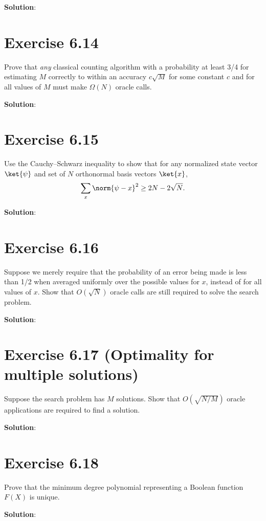\documentclass{book}
\begin{document}
    \textbf{Solution}:

\section*{Exercise 6.14}
    Prove that \emph{any} classical counting algorithm with a probability at least 3/4 for estimating $M$ correctly to within an accuracy $c\sqrt{M}$ for some constant $c$ and for all values of $M$ must make $\Omega (N)$ oracle calls. 
    
    \textbf{Solution}:

\section*{Exercise 6.15}
    Use the Cauchy–Schwarz inequality to show that for any normalized state vector $\ket{\psi}$ and set of $N$ orthonormal basis vectors $\ket{x}$,
    \begin{align}
        \sum_x \norm{\psi -x}^2 \geq 2N-2\sqrt{N}.
    \end{align}
    
    \textbf{Solution}:
    
\section*{Exercise 6.16}
    Suppose we merely require that the probability of an error being made is less than 1/2 when averaged uniformly over the possible values for $x$, instead of for all values of $x$. Show that $O(\sqrt{N})$ oracle calls are still required to solve the search problem. 
    
    \textbf{Solution}:
    
\section*{Exercise 6.17 (Optimality for multiple solutions)}
    Suppose the search problem has $M$ solutions. Show that $O(\sqrt{N/M})$ oracle applications are required to find a solution. 
    
    \textbf{Solution}:
    
\section*{Exercise 6.18}
    Prove that the minimum degree polynomial representing a Boolean function $F(X)$ is unique. 
    
    \textbf{Solution}:
\end{document}
